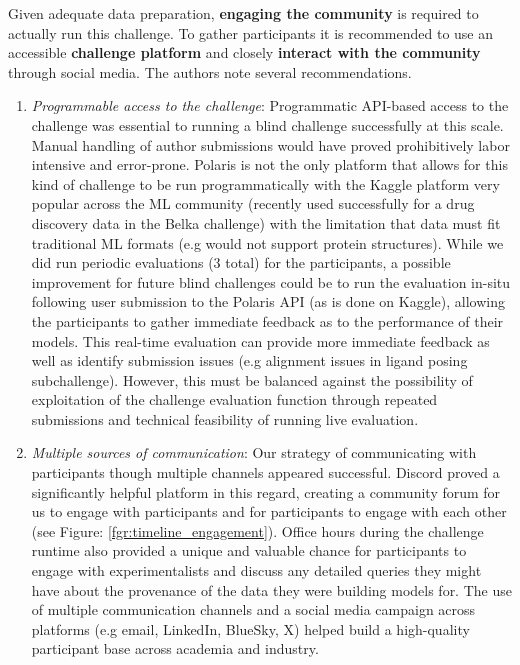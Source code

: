 \documentclass[journal=jcim,manuscript=article]{achemso}
\begin{document}
Given adequate data preparation, \textbf{engaging the community} is required to actually run this challenge. To gather participants it is recommended to use an accessible \textbf{challenge platform} and closely \textbf{interact with the community} through social media. The authors note several recommendations.
\begin{enumerate}
    \item \textit{Programmable access to the challenge}: Programmatic API-based access to the challenge was essential to running a blind challenge successfully at this scale. Manual handling of author submissions would have proved prohibitively labor intensive and error-prone. Polaris is not the only platform that allows for this kind of challenge to be run programmatically with the  Kaggle platform very popular across the ML community (recently used successfully for a drug discovery data in the Belka challenge\cite{quigley2024belka}) with the limitation that data must fit traditional ML formats (e.g would not support protein structures). While we did run periodic evaluations (3 total) for the participants, a possible improvement for future blind challenges could be to run the evaluation in-situ following user submission to the Polaris API (as is done on Kaggle), allowing the participants to gather immediate feedback as to the performance of their models. This real-time evaluation can provide more immediate feedback as well as identify submission issues (e.g alignment issues in ligand posing subchallenge). However, this must be balanced against the possibility of exploitation of the challenge evaluation function through repeated submissions and technical feasibility of running live evaluation.
    \item \textit{Multiple sources of communication}: Our strategy of communicating with participants though multiple channels appeared successful. Discord proved a significantly helpful platform in this regard, creating a community forum for us to engage with participants and for participants to engage with each other (see Figure: \ref{fgr:timeline_engagement}). Office hours during the challenge runtime also provided a unique and valuable chance for participants to engage with experimentalists and discuss any detailed queries they might have about the provenance of the data they were building models for. The use of multiple communication channels and a social media campaign across platforms (e.g email, LinkedIn, BlueSky, X) helped build a high-quality participant base across academia and industry.
    

\end{enumerate}
\end{document}
